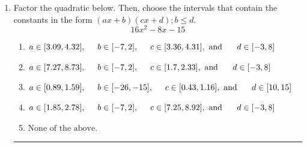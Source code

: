 \documentclass[14pt]{extbook}
\newcommand{\litem}[1]{\item#1\hspace*{-1cm}\rule{\textwidth}{0.4pt}}
\begin{document}
\begin{enumerate}
{\begin{enumerate}[label=\Alph*.]
\end{enumerate} }
\litem{
Factor the quadratic below. Then, choose the intervals that contain the constants in the form $(ax+b)(cx+d); b \leq d.$\[ 16x^{2} -8 x -15 \]\begin{enumerate}[label=\Alph*.]
\item \( a \in [3.09, 4.32], \hspace*{5mm} b \in [-7, 2], \hspace*{5mm} c \in [3.36, 4.31], \text{ and } \hspace*{5mm} d \in [-3, 8] \)
\item \( a \in [7.27, 8.73], \hspace*{5mm} b \in [-7, 2], \hspace*{5mm} c \in [1.7, 2.33], \text{ and } \hspace*{5mm} d \in [-3, 8] \)
\item \( a \in [0.89, 1.59], \hspace*{5mm} b \in [-26, -15], \hspace*{5mm} c \in [0.43, 1.16], \text{ and } \hspace*{5mm} d \in [10, 15] \)
\item \( a \in [1.85, 2.78], \hspace*{5mm} b \in [-7, 2], \hspace*{5mm} c \in [7.25, 8.92], \text{ and } \hspace*{5mm} d \in [-3, 8] \)
\item \( \text{None of the above.} \)


\end{enumerate}}
\end{enumerate}
\end{document}
